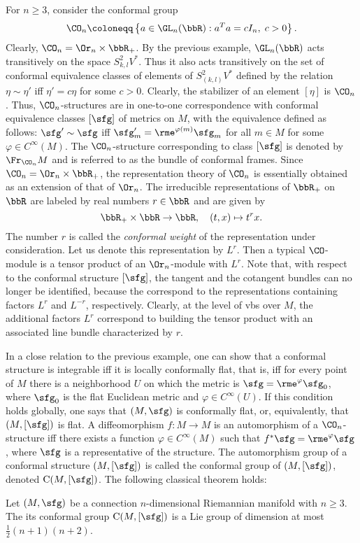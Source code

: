 \begin{example}
    For $n\geq 3$, consider the conformal group 
    \[\CO_n\coloneqq \left\{a\in\GL_n(\bbR):a^Ta=cI_n,\; c>0\right\}.\]
    Clearly, $\CO_n=\Or_n\times\bbR_+$. By the previous example, $\GL_n(\bbR)$ acts transitively on the space $S^2_{k,l}V^\ast$. Thus it also acts transitively on the set of conformal equivalence classes of elements of $S^2_{(k,l)}V^\ast$ defined by the relation $\eta\sim\eta'$ iff $\eta'=c\eta$ for some $c>0$. Clearly, the stabilizer of an element $[\eta]$ is $\CO_n$. Thus, $\CO_n$-structures are in one-to-one correspondence with conformal equivalence classes $[\sfg]$ of metrics on $M$, with the equivalence defined as follows: $\sfg'\sim\sfg$ iff $\sfg'_m=\rme^{\varphi(m)}\sfg_m$ for all $m\in M$ for some $\varphi\in C^\infty(M)$. The $\CO_n$-structure corresponding to class $[\sfg]$ is denoted by $\Fr_{\CO_n}M$ and is referred to as the bundle of conformal frames.
    Since $\CO_n=\Or_n\times\bbR_+$, the representation theory of $\CO_n$ is essentially obtained as an extension of that of $\Or_n$. The irreducible representations of $\bbR_+$ on $\bbR$ are labeled by real numbers $r\in\bbR$ and are given by 
    \[\bbR_+\times\bbR\to \bbR,\quad (t,x)\mapsto t^r x.\]
    The number $r$ is called the \emph{conformal weight} of the representation under consideration. Let us denote this representation by $L^r$. Then a typical $\CO$-module is a tensor product of an $\Or_n$-module with $L^r$. Note that, with respect to the conformal structure $[\sfg]$, the tangent and the cotangent bundles can no longer be identified, because the correspond to the representations containing factors $L^r$ and $L^{-r}$, respectively. Clearly, at the level of \glspl{vb} over $M$, the additional factors $L^r$ correspond to building the tensor product with an associated line bundle characterized by $r$.

    In a close relation to the previous example, one can show that a conformal structure is integrable iff it is locally conformally flat, that is, iff for every point of $M$ there is a neighborhood $U$ on which the metric is $\sfg=\rme^{\varphi}\sfg_0$, where $\sfg_0$ is the flat Euclidean metric and $\varphi\in C^\infty(U)$. If this condition holds globally, one says that $(M,\sfg)$ is conformally flat, or, equivalently, that $(M,[\sfg])$ is flat. A diffeomorphism $f:M\to M$ is an automorphism of a $\CO_n$-structure iff there exists a function $\varphi\in C^\infty(M)$ such that $f^\ast\sfg=\rme^\varphi \sfg$, where $\sfg$ is a representative of the structure. The automorphism group of a conformal structure $(M,[\sfg])$ is called the conformal group of $(M,[\sfg])$, denoted $\mathrm{C}(M,[\sfg])$. The following classical theorem holds: 
    \begin{thm}
        Let $(M,\sfg)$ be a connection $n$-dimensional Riemannian manifold with $n\geq 3$. The its conformal group $\mathrm{C}(M,[\sfg])$ is a Lie group of dimension at most $\frac12(n+1)(n+2)$.
    \end{thm}
\end{example}


